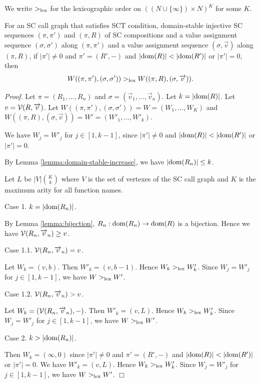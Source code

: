 \begin{Def}\rm
We write $>_{\rm lex}$ for the lexicographic order on $((N\cup\{\infty\}) \times N)^K$
for some $K$.
\end{Def}

\begin{Lemma}\label{lemma:stable-extension}
For an SC call graph that satisfies SCT condition,
domain-stable injective SC sequences $(\pi,\pi')$ and 
$(\pi,R)$ of SC compositions and 
a value assignment sequence $(\sigma,\sigma')$ along $(\pi,\pi')$ and
a value assignment sequence $(\sigma,\Vec v)$ along $(\pi,R)$,
if $|\pi'|\ne 0$ and $\pi'=(R',-)$ and $|\dom(R)|<|\dom(R')|$ or $|\pi'|=0$,
then
\[
W((\pi,\pi'),(\sigma,\sigma'))
>_{\rm lex}
W((\pi,R),(\sigma,\overrightarrow v)).
\]
\end{Lemma}

{\em Proof.}
Let $\pi=(R_1,\ldots,R_n)$ and $\sigma = (\Vec v_1,\ldots,\Vec v_n)$.
Let $k=|{\rm dom}(R)|$.
Let $v = {{\mathcal V}}(R,\overrightarrow v)$.
Let $W((\pi,\pi'),(\sigma,\sigma')) = W = (W_1,\ldots,W_K)$ and
$W((\pi,R),(\sigma,\Vec v)) = W' = (W'_1,\ldots,W'_k)$.

We have $W_j = W'_j$ for $j \in [1,k-1]$, 
since $|\pi'|\ne 0$ and $|\dom(R)|<|\dom(R')|$ or $|\pi'|=0$.

By Lemma \ref{lemma:domain-stable-increase}, 
we have $|{\rm dom}(R_{n})| \le k$.

Let $L$ be $|V|{K \choose k}$ 
where $V$ is the set of vertexes of the SC call graph
and $K$ is the maximum arity for all function names.

Case 1. $k=|{\rm dom}(R_{n})|$.

By Lemma \ref{lemma:bijection},
$
R_n:{\rm dom}(R_n) \to {\rm dom}(R)
$
is a bijection.
Hence we have ${{\mathcal V}}(R_n,\overrightarrow {v}_{n}) \ge v$.

Case 1.1. ${{\mathcal V}}(R_n,\overrightarrow {v}_{n}) = v$.

Let $W_k = (v,b)$.
Then $W'_k = (v, b-1)$.
Hence $W_k >_{\rm lex} W'_k$.
Since $W_j = W'_j$ for $j \in [1,k-1]$,
we have $W >_{\rm lex} W'$.

Case 1.2. ${{\mathcal V}}(R_{n},\overrightarrow {v}_{n}) > v$.

Let $W_k = ({{\mathcal V}}(R_{n},\overrightarrow {v}_{n}),-)$.
Then $W'_k = (v, L)$.
Hence $W_k >_{\rm lex} W'_k$.
Since $W_j = W'_j$ for $j \in [1,k-1]$,
we have $W >_{\rm lex} W'$.

Case 2. $k>|{\rm dom}(R_{n})|$.

Then $W_k = (\infty,0)$ since 
$|\pi'|\ne 0$ and $\pi'=(R',-)$ and $|\dom(R)|<|\dom(R')|$ or $|\pi'|=0$.
We have $W'_k = (v, L)$.
Hence $W_k >_{\rm lex} W'_k$.
Since $W_j = W'_j$ for $j \in [1,k-1]$,
we have $W >_{\rm lex} W'$.
$\Box$

